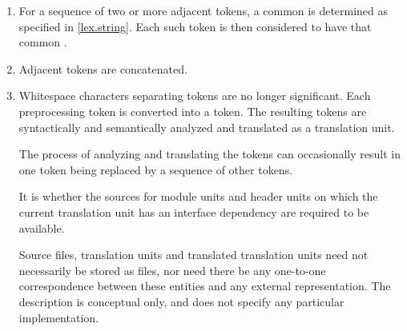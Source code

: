 \documentclass{wg21}
\begin{document}
\begin{enumerate}
    \item
    For a sequence of two or more adjacent  tokens,
    a common  is determined
    as specified in \ref{lex.string}.
    Each such  token is then considered to have
    that common .

    \item
    Adjacent  tokens are concatenated.

    \item Whitespace characters separating tokens are no longer
    significant. Each preprocessing token is converted into a
    token. The resulting tokens are syntactically and
    semantically analyzed and translated as a translation unit.
    \begin{note}
        The process of analyzing and translating the tokens can occasionally
        result in one token being replaced by a sequence of other
        tokens.
    \end{note}
    It is
    whether the sources for
    module units and header units
    on which the current translation unit has an interface
    dependency
    are required to be available.
    \begin{note}
        Source files, translation
        units and translated translation units need not necessarily be stored as
        files, nor need there be any one-to-one correspondence between these
        entities and any external representation. The description is conceptual
        only, and does not specify any particular implementation.
    \end{note}


\end{enumerate}
\end{document}
